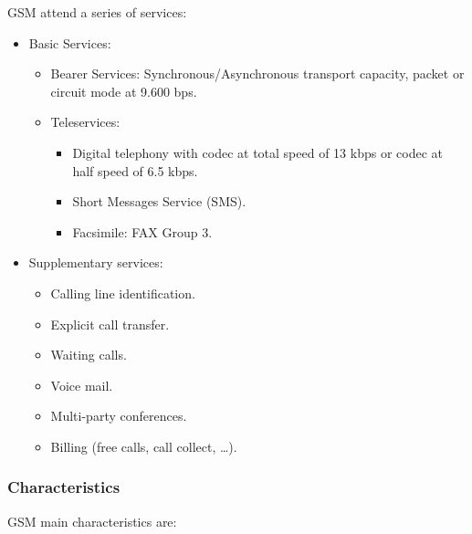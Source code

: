 \documentclass[../main.tex]{subfiles}
\begin{document}
GSM attend a series of services:

\begin{itemize}
	\item {
		Basic Services:
		\begin{itemize}
			\item Bearer Services: Synchronous/Asynchronous transport capacity, packet or circuit mode at 9.600 bps.
			\item {
				Teleservices:
				\begin{itemize}
					\item Digital telephony with codec at total speed of 13 kbps or codec at half speed of 6.5 kbps.
					\item Short Messages Service (SMS).
					\item Facsimile: FAX Group 3.
				\end{itemize}
			}
		\end{itemize}
	}
	\item {
		Supplementary services:
		\begin{itemize}
			\item Calling line identification.
			\item Explicit call transfer.
			\item Waiting calls.
			\item Voice mail.
			\item Multi-party conferences.
			\item Billing (free calls, call collect, \ldots).
		\end{itemize}
	}
\end{itemize}

\subsubsection{Characteristics}

GSM main characteristics are:
\end{document}
